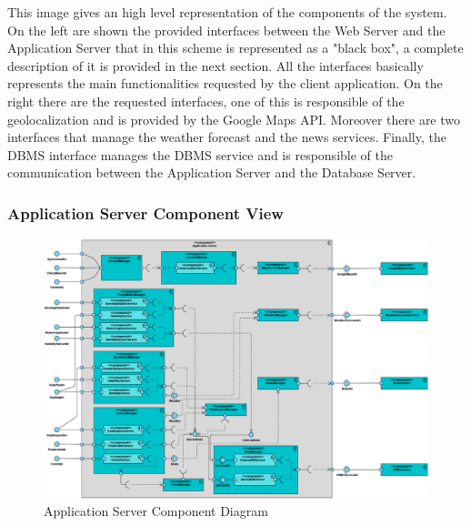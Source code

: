 \documentclass[table, 12pt]{article}
\begin{document}
This image gives an high level representation of the components of the system.
On the left are shown the provided interfaces between the Web Server and the Application Server that in this scheme is represented as a "black box", a complete description of it is provided in the next section.
All the interfaces basically represents the main functionalities requested by the client application.
On the right there are the requested interfaces, one of this is responsible of the geolocalization and is provided by the Google Maps API.
Moreover there are two interfaces that manage the weather forecast and the news services.
Finally, the DBMS interface manages the DBMS service and is responsible of the communication between the Application Server and the Database Server.

\subsubsection*{Application Server Component View}
\begin{center}
    \begin{figure}[H]
        \includegraphics[scale=0.45, center]{assets/application-server-component.png}
        \caption{Application Server Component Diagram}
        \label{fig: application_server_component_view}
    \end{figure}
\end{center}
\end{document}
